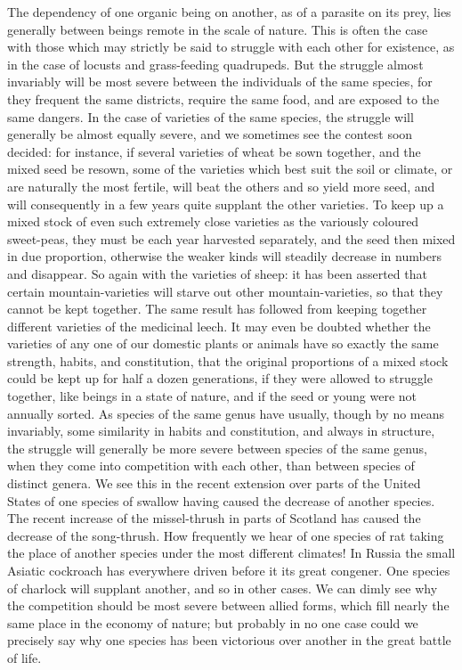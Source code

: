The dependency of one organic being on another, as of a parasite on its prey, lies generally between beings remote in the scale of nature. This is often the case with those which may strictly be said to struggle with each other for existence, as in the case of locusts and grass-feeding quadrupeds. But the struggle almost invariably will be most severe between the individuals of the same species, for they frequent the same districts, require the same food, and are exposed to the same dangers. In the case of varieties of the same species, the struggle will generally be almost equally severe, and we sometimes see the contest soon decided: for instance, if several varieties of wheat be sown together, and the mixed seed be resown, some of the varieties which best suit the soil or climate, or are naturally the most fertile, will beat the others and so yield more seed, and will consequently in a few years quite supplant the other varieties. To keep up a mixed stock of even such extremely close varieties as the variously coloured sweet-peas, they must be each year harvested separately, and the seed then mixed in due proportion, otherwise the weaker kinds will steadily decrease in numbers and disappear. So again with the varieties of sheep: it has been asserted that certain mountain-varieties will starve out other mountain-varieties, so that they cannot be kept together. The same result has followed from keeping together different varieties of the medicinal leech. It may even be doubted whether the varieties of any one of our domestic plants or animals have so exactly the same strength, habits, and constitution, that the original proportions of a mixed stock could be kept up for half a dozen generations, if they were allowed to struggle together, like beings in a state of nature, and if the seed or young were not annually sorted.
As species of the same genus have usually, though by no means invariably, some similarity in habits and constitution, and always in structure, the struggle will generally be more severe between species of the same genus, when they come into competition with each other, than between species of distinct genera. We see this in the recent extension over parts of the United States of one species of swallow having caused the decrease of another species. The recent increase of the missel-thrush in parts of Scotland has caused the decrease of the song-thrush. How frequently we hear of one species of rat taking the place of another species under the most different climates! In Russia the small Asiatic cockroach has everywhere driven before it its great congener. One species of charlock will supplant another, and so in other cases. We can dimly see why the competition should be most severe between allied forms, which fill nearly the same place in the economy of nature; but probably in no one case could we precisely say why one species has been victorious over another in the great battle of life.
